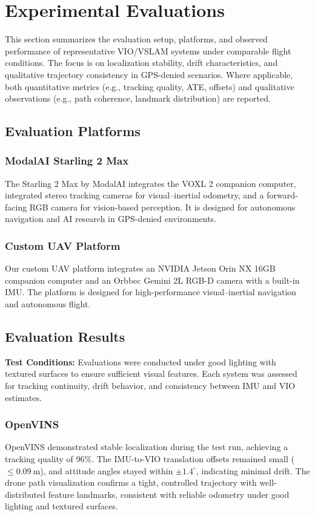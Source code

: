 \section{Experimental Evaluations}
This section summarizes the evaluation setup, platforms, and observed performance of representative VIO/VSLAM systems under comparable flight conditions. The focus is on localization stability, drift characteristics, and qualitative trajectory consistency in GPS-denied scenarios. Where applicable, both quantitative metrics (e.g., tracking quality, ATE, offsets) and qualitative observations (e.g., path coherence, landmark distribution) are reported.
\subsection{Evaluation Platforms}
\subsubsection{ModalAI Starling 2 Max}
The Starling 2 Max by ModalAI integrates the VOXL 2 companion computer, integrated stereo tracking cameras for visual--inertial odometry, and a forward-facing RGB camera for vision-based perception. It is designed for autonomous navigation and AI research in GPS-denied environments.

\subsubsection{Custom UAV Platform}
Our custom UAV platform integrates an NVIDIA Jetson Orin NX 16GB companion computer and an Orbbec Gemini 2L RGB-D camera with a built-in IMU. The platform is designed for high-performance visual--inertial navigation and autonomous flight.

\subsection{Evaluation Results}
\noindent\textbf{Test Conditions:} Evaluations were conducted under good lighting with textured surfaces to ensure sufficient visual features. Each system was assessed for tracking continuity, drift behavior, and consistency between IMU and VIO estimates.

\subsubsection{OpenVINS}
OpenVINS demonstrated stable localization during the test run, achieving a tracking quality of 96\%. The IMU-to-VIO translation offsets remained small (\(\leq 0.09~\text{m}\)), and attitude angles stayed within \(\pm 1.4^{\circ}\), indicating minimal drift. The drone path visualization confirms a tight, controlled trajectory with well-distributed feature landmarks, consistent with reliable odometry under good lighting and textured surfaces.

